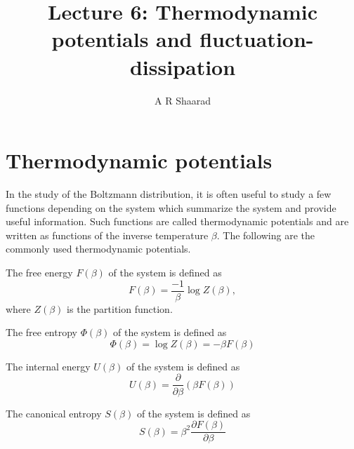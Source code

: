 \documentclass[letterpaper,english,12pt]{article}
\title{Lecture 6: Thermodynamic potentials and fluctuation-dissipation}
\author{A R Shaarad}
\begin{document}
\maketitle
\section{Thermodynamic potentials}
In the study of the Boltzmann distribution, it is often useful to study a few functions depending on the system which summarize the system and provide useful information. Such functions are called thermodynamic potentials and are written as functions of the inverse temperature $\beta$. The following are the commonly used thermodynamic potentials.
\begin{defn}
The free energy $F(\beta)$ of the system is defined as
$$F(\beta) = \frac{-1}{\beta} \log Z(\beta),$$
where $Z(\beta)$ is the partition function.
\end{defn}
\begin{defn}
The free entropy $\Phi(\beta)$ of the system is defined as
$$\Phi(\beta) = \log Z(\beta) = -\beta F(\beta)$$
\end{defn}
\begin{defn}
The internal energy $U(\beta)$ of the system is defined as
$$U(\beta) = \frac{\partial}{\partial \beta} (\beta F(\beta))$$
\end{defn}
\begin{defn}
The canonical entropy $S(\beta)$ of the system is defined as
$$S(\beta) = \beta^2 \frac{\partial F(\beta)}{\partial \beta}$$
\end{defn}
\end{document}
